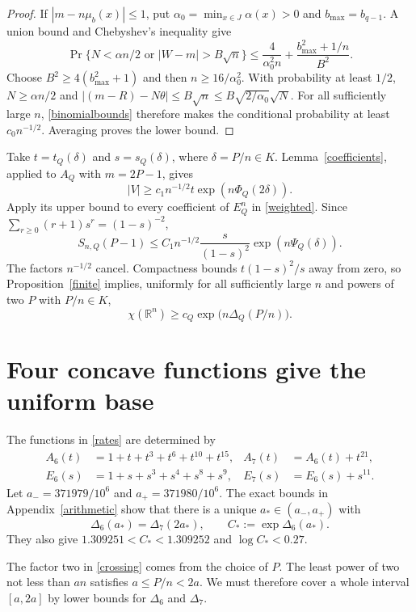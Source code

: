 \documentclass[12pt,a4paper]{article}
\newcommand{\R}{\mathbb R}
\begin{document}
\begin{proof}
If $|m-n\mu_b(x)|\le1$, put $\alpha_0=\min_{x\in J}\alpha(x)>0$ and $b_{\max}=b_{q-1}$. A union bound and Chebyshev's inequality give
\[
\Pr\{N<\alpha n/2\text{ or }|W-m|>B\sqrt n\}
\le\frac4{\alpha_0^2 n}+\frac{b_{\max}^2+1/n}{B^2}.
\]
Choose $B^2\ge4(b_{\max}^2+1)$ and then $n\ge16/\alpha_0^2$. With probability at least $1/2$, $N\ge\alpha n/2$ and
$|(m-R)-N\theta|\le B\sqrt n\le B\sqrt{2/\alpha_0}\sqrt N$.
For all sufficiently large $n$, \eqref{binomialbounds} therefore makes the conditional probability at least $c_0n^{-1/2}$. Averaging proves the lower bound.
\end{proof}

Take $t=t_Q(\delta)$ and $s=s_Q(\delta)$, where $\delta=P/n\in K$. Lemma~\ref{coefficients}, applied to $A_Q$ with $m=2P-1$, gives
\[
|V|\ge c_1 n^{-1/2}t\exp(n\Phi_Q(2\delta)).
\]
Apply its upper bound to every coefficient of $E_Q^n$ in \eqref{weighted}. Since $\sum_{r\ge0}(r+1)s^r=(1-s)^{-2}$,
\[
S_{n,Q}(P-1)\le C_1 n^{-1/2}\frac{s}{(1-s)^2}\exp(n\Psi_Q(\delta)).
\]
The factors $n^{-1/2}$ cancel. Compactness bounds $t(1-s)^2/s$ away from zero, so Proposition~\ref{finite} implies, uniformly for all sufficiently large $n$ and powers of two $P$ with $P/n\in K$,
\begin{equation}\label{uniform}
\chi(\R^n)\ge c_Q\exp\bigl(n\Delta_Q(P/n)\bigr).
\end{equation}

\section{Four concave functions give the uniform base}\label{coversection}
The functions in \eqref{rates} are determined by
\begin{align*}
A_6(t)&=1+t+t^3+t^6+t^{10}+t^{15},& A_7(t)&=A_6(t)+t^{21},\\
E_6(s)&=1+s+s^3+s^4+s^8+s^9,& E_7(s)&=E_6(s)+s^{11}.
\end{align*}
Let $a_-=371979/10^6$ and $a_+=371980/10^6$.
The exact bounds in Appendix~\ref{arithmetic} show that there is a unique $a_*\in(a_-,a_+)$ with
\begin{equation}\label{crossing}
\Delta_6(a_*)=\Delta_7(2a_*),\qquad
C_*:=\exp\Delta_6(a_*).
\end{equation}
They also give $1.309251<C_*<1.309252$ and $\log C_*<0.27$.

The factor two in \eqref{crossing} comes from the choice of $P$. The least power of two not less than $an$ satisfies $a\le P/n<2a$. We must therefore cover a whole interval $[a,2a]$ by lower bounds for $\Delta_6$ and $\Delta_7$.
\end{document}
